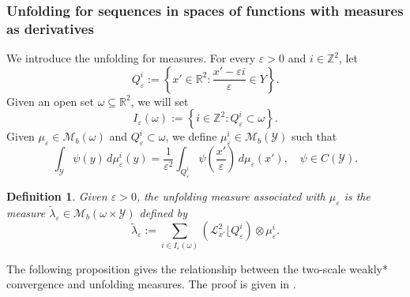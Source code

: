 \documentclass[reqno,10pt]{amsart}
\numberwithin{equation}{section}
\newtheorem{definition}[theorem]{Definition}
\theoremstyle{remark}
\newcommand{\calL}{\mathcal{L}}
\newcommand{\R}{\mathbb{R}}
\newcommand{\calY}{\mathcal{Y}}
\newcommand{\Z}{\mathbb{Z}}
\newcommand{\eps}{\varepsilon}
\newcommand{\Mb}{\mathcal{M}_b}
\newcommand{\mres}[1]{\lfloor{#1}}
\begin{document}
\subsubsection{Unfolding for sequences in spaces of functions with measures as derivatives} \label{section unfolding for sequances}
We introduce the unfolding for measures. 
For every $\eps > 0$ and $i \in \Z^2$, let
\begin{equation*}
	Q_\eps^i := \left\{ x' \in \R^2 : \frac{x'-\eps i}{\eps} \in Y \right\}.
\end{equation*}
Given an open set $\omega \subseteq \R^2$, we will set
\begin{equation}\label{cubes inside} 
	I_\eps(\omega) := \left\{ i \in \Z^2 : Q_\eps^i \subset \omega \right\}.
\end{equation}
Given $\mu_\eps \in \Mb(\omega)$ and $Q_\eps^i \subset \omega$, we define $\mu_\eps^i \in \Mb(\calY)$ such that
\begin{equation*}
	\int_{\calY} \psi(y) \,d\mu_\eps^i(y) = \frac{1}{\eps^2} \int_{Q_\eps^i} \psi\left(\frac{x'}{\eps}\right) \,d\mu_\eps(x'), \quad \psi \in C(\calY).
\end{equation*}
\begin{definition}
Given $\eps > 0$, \emph{the unfolding measure} associated with $\mu_\eps$ is the measure $\tilde{\lambda}_\eps \in \Mb(\omega \times \calY)$ defined by
\begin{equation*}
	\tilde{\lambda}_\eps := \sum_{i \in I_\eps(\omega)} \left( \calL_{x'}^2\mres{Q_\eps^i} \right) \otimes \mu_\eps^i.
\end{equation*}
\end{definition}

The following proposition gives the relationship between the two-scale weakly* convergence and unfolding measures.
The proof is given in \cite[Proposition 4.11.]{Francfort.Giacomini.2014}.
\end{document}
